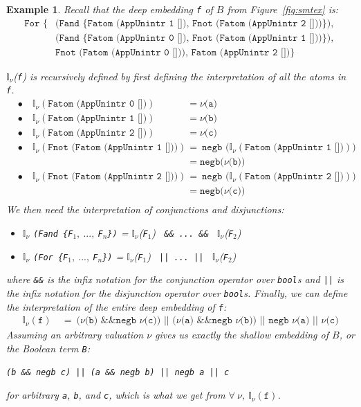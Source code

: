 \documentclass[11pt]{article}
\newtheorem{example}{Example}[section]
\newcommand{\avar}{Fatom (AppUnintr 0 [])}
\newcommand{\bvar}{Fatom (AppUnintr 1 [])}
\newcommand{\cvar}{Fatom (AppUnintr 2 [])}
\newcommand{\fnot}[1]{Fnot (#1)}
\newcommand{\intr}[1]{\mathbb{I}_{\nu}(#1)}
\begin{document}
	\begin{example}
		\em Recall that the deep embedding
		\texttt{f} of $B$ from 
		Figure~\ref{fig:smtex} is:
		\begin{align*}
			\texttt{For \{}
			&\texttt{(Fand \{\bvar,\ 
				\fnot{\cvar}\}), }\\
			&\texttt{(Fand \{\avar,\ 
				\fnot{\bvar}\}), }\\
			&\texttt{\fnot \avar, 
				\cvar\}}  
		\end{align*}

		$\mathbb{I}_{\nu}$(\texttt{f}) 
		is recursively defined
		by first defining the interpretation
		of all the atoms in \texttt{f}.
		\begin{align*}
			&\bullet\quad \intr{\texttt{\avar}} 
			&= \texttt{$\nu$(a)}\\
			&\bullet\quad \intr{\texttt{\bvar}} 
			&= \texttt{$\nu$(b)}\\
			&\bullet\quad \intr{\texttt{\cvar}} 
			&= \texttt{$\nu$(c)}\\
			&\bullet\quad \intr{\texttt{\fnot{\bvar}}} &= \ 
			\texttt{negb (}\intr{\texttt{\bvar}}\texttt{)}\\
			& &= \texttt{negb(}\nu
			\texttt{(b))}\\
			&\bullet\quad \intr{\texttt{\fnot{\cvar}}} &= \ 
			\texttt{negb (}\intr{\texttt{\cvar}}\texttt{)}\\
			& &= \texttt{negb(}\nu
			\texttt{(c))}\\
		\end{align*}
		We then need the interpretation of 
		conjunctions and disjunctions:
		\begin{itemize}
			\item$\mathbb{I}_{\nu}$
			\texttt{(Fand \{F$_1,\ ...,\ $F$_n$\})} = 
			$\mathbb{I}_{\nu}$(\texttt{F$_1$})
			\texttt{ \&\& ... \&\& }
			$\mathbb{I}_{\nu}$(\texttt{F$_2$})
			\item$\mathbb{I}_{\nu}$
			\texttt{(For \{F$_1,\ ...,\ $F$_n$\})} = 
			$\mathbb{I}_{\nu}$(\texttt{F$_1$})
			\texttt{ || ... || }
			$\mathbb{I}_{\nu}$(\texttt{F$_2$})
		\end{itemize}
		where \texttt{\&\&} is the infix notation
		for the conjunction operator over 
		\texttt{bool}s and \texttt{||} is the 
		infix notation for the disjunction operator 
		over \texttt{bool}s. Finally, we can define 
		the interpretation 
		of the entire deep embedding of \texttt{f}:
		\begin{align*}
			\intr{\texttt{f}}\ &=\ 
			\texttt{($\nu$(b) \&\& negb $\nu$(c)) ||
					($\nu$(a) \&\& negb $\nu$(b)) ||
					negb $\nu$(a) ||
					$\nu$(c)}
		\end{align*}
		Assuming an arbitrary valuation 
		$\nu$ gives us exactly the shallow 
		embedding of $B$, or the Boolean
		term \texttt{B}:
		\begin{center}
			\texttt{(b \&\& negb c) || (a 
				\&\& negb b) || negb a || c}
		\end{center}
		for arbitrary \texttt{a}, \texttt{b},
		and \texttt{c}, which is what we 
		get from 
		$\forall\ \nu,\ \intr{\texttt{f}}$.
		

\end{example}
\end{document}
